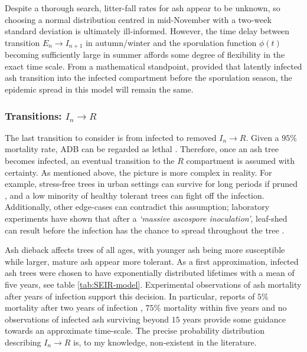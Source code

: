 Despite a thorough search, litter-fall rates for ash appear to be unknown, so choosing a normal distribution centred in mid-November with a two-week standard deviation is ultimately ill-informed. 
However, the time delay between transition $E_n \rightarrow I_{n+1}$ in autumn/winter and the sporulation function $\phi(t)$ becoming sufficiently large in summer affords some degree of flexibility in the exact time scale.
From a mathematical standpoint, provided that latently infected ash transition into the infected compartment before the sporulation season,
the epidemic spread in this model will remain the same.


\subsubsection{Transitions: $I_n\rightarrow R$}

The last transition to consider is from infected to removed $I_{n}\rightarrow R$. Given a $95\%$ mortality rate, ADB can be regarded as lethal \cite{ash-dieback-costs}.
Therefore, once an ash tree becomes infected, an eventual transition to the $R$ compartment is assumed with certainty.
As mentioned above, the picture is more complex in reality. 
For example, stress-free trees in urban settings can survive for long periods if pruned \cite{marciulyniene2017can}, and a low minority of healthy tolerant trees can fight off the infection.
Additionally, other edge-cases can contradict this assumption;
laboratory experiments have shown that after a \textit{`massive ascospore inoculation'}, leaf-shed can result before the infection has the chance to spread throughout the tree \cite{https://doi.org/10.1111/mpp.12073}.

Ash dieback affects trees of all ages, with younger ash being more susceptible while larger, mature ash appear more tolerant. 
As a first approximation, infected ash trees were chosen to have exponentially distributed lifetimes with a mean of five years, see table \ref{tab:SEIR-model}.
Experimental observations of ash mortality after years of infection support this decision. 
In particular, reports of $5\%$ mortality after two years of infection \cite{kessler2012dieback}, $75\%$ mortality within five years \cite{langer2015ash}  %
and no observations of infected ash surviving beyond $15$ years \cite{wylder2018evidence} provide some guidance towards an approximate time-scale.
The precise probability distribution describing $I_{n}\rightarrow R$ is, to my knowledge, non-existent in the literature.

